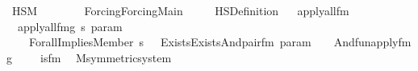 %
\begin{isabellebody}%
%
%
\isadelimtheory
%
\endisadelimtheory
%
\isatagtheory
{}\isamarkupfalse%
\ HS{\isacharunderscore}{\kern0pt}M\isanewline
\ \ \ \isanewline
\ \ \ \ {\isachardoublequoteopen}Forcing{\isacharslash}{\kern0pt}Forcing{\isacharunderscore}{\kern0pt}Main{\isachardoublequoteclose}\ \isanewline
\ \ \ \ HS{\isacharunderscore}{\kern0pt}Definition\isanewline
{}%
\endisatagtheory
{\isafoldtheory}%
%
\isadelimtheory
\ \isanewline
%
\endisadelimtheory
\isanewline
\isanewline
{}\isamarkupfalse%
\ apply{\isacharunderscore}{\kern0pt}all{\isacharunderscore}{\kern0pt}{}{\isacharunderscore}{\kern0pt}fm\ \ \isanewline
\ \ {\isachardoublequoteopen}apply{\isacharunderscore}{\kern0pt}all{\isacharunderscore}{\kern0pt}{}{\isacharunderscore}{\kern0pt}fm{\isacharparenleft}{\kern0pt}g{\isacharcomma}{\kern0pt}\ s{\isacharcomma}{\kern0pt}\ param{\isacharparenright}{\kern0pt}\ {\isasymequiv}\ \isanewline
\ \ \ \ Forall{\isacharparenleft}{\kern0pt}Implies{\isacharparenleft}{\kern0pt}Member{\isacharparenleft}{\kern0pt}{}{\isacharcomma}{\kern0pt}\ s\ {\isacharhash}{\kern0pt}{\isacharplus}{\kern0pt}\ {}{\isacharparenright}{\kern0pt}{\isacharcomma}{\kern0pt}\ Exists{\isacharparenleft}{\kern0pt}Exists{\isacharparenleft}{\kern0pt}And{\isacharparenleft}{\kern0pt}pair{\isacharunderscore}{\kern0pt}fm{\isacharparenleft}{\kern0pt}{}{\isacharcomma}{\kern0pt}\ param\ {\isacharhash}{\kern0pt}{\isacharplus}{\kern0pt}\ {}{\isacharcomma}{\kern0pt}\ {}{\isacharparenright}{\kern0pt}{\isacharcomma}{\kern0pt}\ And{\isacharparenleft}{\kern0pt}fun{\isacharunderscore}{\kern0pt}apply{\isacharunderscore}{\kern0pt}fm{\isacharparenleft}{\kern0pt}g\ {\isacharhash}{\kern0pt}{\isacharplus}{\kern0pt}\ {}{\isacharcomma}{\kern0pt}\ {}{\isacharcomma}{\kern0pt}\ {}{\isacharparenright}{\kern0pt}{\isacharcomma}{\kern0pt}\ is{\isacharunderscore}{\kern0pt}{}{\isacharunderscore}{\kern0pt}fm{\isacharparenleft}{\kern0pt}{}{\isacharparenright}{\kern0pt}{\isacharparenright}{\kern0pt}{\isacharparenright}{\kern0pt}{\isacharparenright}{\kern0pt}{\isacharparenright}{\kern0pt}{\isacharparenright}{\kern0pt}{\isacharparenright}{\kern0pt}{\isachardoublequoteclose}\ \isanewline
\isanewline
{}\isamarkupfalse%
\ M{\isacharunderscore}{\kern0pt}symmetric{\isacharunderscore}{\kern0pt}system\isanewline

\end{isabellebody}
